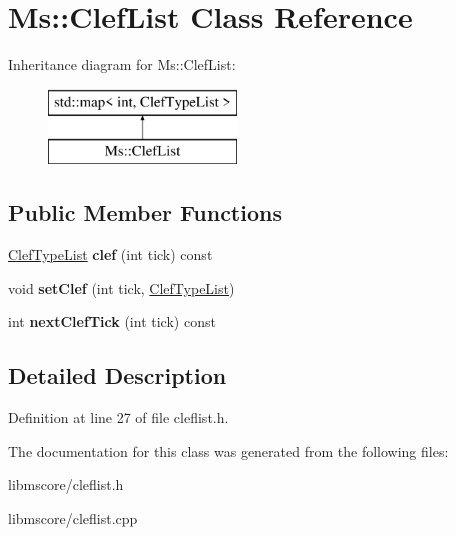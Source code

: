 \hypertarget{class_ms_1_1_clef_list}{}\section{Ms\+:\+:Clef\+List Class Reference}
\label{class_ms_1_1_clef_list}
Inheritance diagram for Ms\+:\+:Clef\+List\+:\begin{figure}[H]
\begin{center}
\leavevmode
\includegraphics[height=2.000000cm]{class_ms_1_1_clef_list}
\end{center}
\end{figure}
\subsection*{Public Member Functions}
\begin{DoxyCompactItemize}
\item 
\mbox{\label{class_ms_1_1_clef_list_a5081a97f1fbb496f83cc6fa30071927d}} 
\hyperlink{struct_ms_1_1_clef_type_list}{Clef\+Type\+List} {\bfseries clef} (int tick) const
\item 
\mbox{\label{class_ms_1_1_clef_list_a2c3a09abcd302547ceca3ca3729bc92b}} 
void {\bfseries set\+Clef} (int tick, \hyperlink{struct_ms_1_1_clef_type_list}{Clef\+Type\+List})
\item 
\mbox{\label{class_ms_1_1_clef_list_a883c91be786e335b23e4e2d883294dba}} 
int {\bfseries next\+Clef\+Tick} (int tick) const
\end{DoxyCompactItemize}


\subsection{Detailed Description}


Definition at line 27 of file cleflist.\+h.



The documentation for this class was generated from the following files\+:\begin{DoxyCompactItemize}
\item 
libmscore/cleflist.\+h\item 
libmscore/cleflist.\+cpp\end{DoxyCompactItemize}
